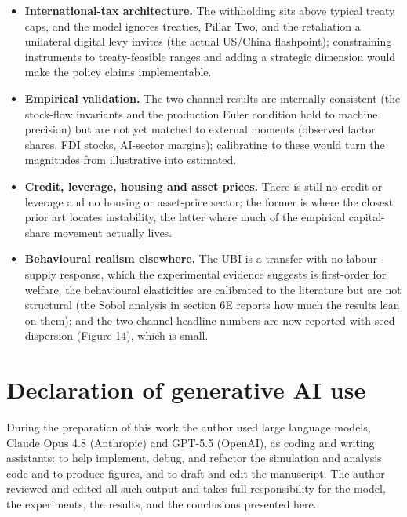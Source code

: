 \documentclass[11pt]{article}
\providecommand{\tightlist}{\setlength{\itemsep}{0pt}\setlength{\parskip}{0pt}}
\begin{document}
\begin{itemize}
\tightlist
\item
  \textbf{International-tax architecture.} The withholding sits above
  typical treaty caps, and the model ignores treaties, Pillar Two, and
  the retaliation a unilateral digital levy invites (the actual US/China
  flashpoint); constraining instruments to treaty-feasible ranges and
  adding a strategic dimension would make the policy claims
  implementable.
\item
  \textbf{Empirical validation.} The two-channel results are internally
  consistent (the stock-flow invariants and the production Euler
  condition hold to machine precision) but are not yet matched to
  external moments (observed factor shares, FDI stocks, AI-sector
  margins); calibrating to these would turn the magnitudes from
  illustrative into estimated.
\item
  \textbf{Credit, leverage, housing and asset prices.} There is still no
  credit or leverage and no housing or asset-price sector; the former is
  where the closest prior art locates instability, the latter where much
  of the empirical capital-share movement actually lives.
\item
  \textbf{Behavioural realism elsewhere.} The UBI is a transfer with no
  labour-supply response, which the experimental evidence suggests is
  first-order for welfare; the behavioural elasticities are calibrated
  to the literature but are not structural (the Sobol analysis in
  section 6E reports how much the results lean on them); and the
  two-channel headline numbers are now reported with seed dispersion
  (Figure 14), which is small.
\end{itemize}

\hypertarget{refs}{}



\section*{Declaration of generative AI use}
During the preparation of this work the author used large language models, Claude Opus 4.8 (Anthropic) and GPT-5.5 (OpenAI), as coding and writing assistants: to help implement, debug, and refactor the simulation and analysis code and to produce figures, and to draft and edit the manuscript. The author reviewed and edited all such output and takes full responsibility for the model, the experiments, the results, and the conclusions presented here.
\end{document}
